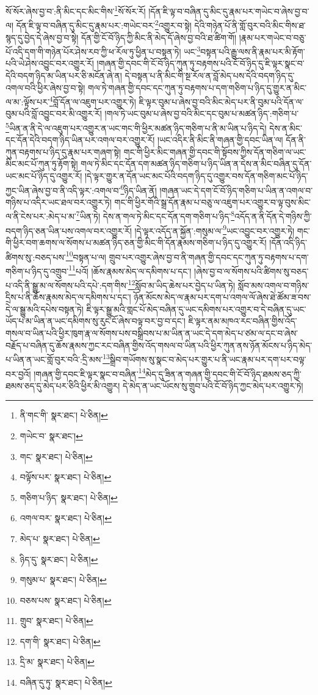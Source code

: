 སོ་སོར་ཞེས་བྱ་བ་:ནི་མིང་དང་མིང་གིས་\footnote{ནི་གང་གི་  སྣར་ཐང་།  པེ་ཅིན། }སོ་སོར་རོ། །དོན་ཇི་ལྟ་བ་བཞིན་དུ་མིང་དུ་རྣམ་པར་གཡེང་བ་ཞེས་བྱ་བ་ལ། དོན་ཇི་ལྟ་བ་བཞིན་དུ་མིང་དུ་རྣམ་པར་:གཡེང་བར་\footnote{གཡེང་བ་  སྣར་ཐང་། }འགྱུར་བ་སྟེ། དེའི་གཉེན་པོ་ནི་གློ་བུར་བའི་མིང་གིས་ཐ་སྙད་དུ་བྱེད་དེ་ཞེས་བྱ་བ་སྟེ། དོན་གྱི་ངོ་བོ་ཉིད་ཀྱི་མིང་ནི་མེད་དོ་ཞེས་བྱ་བའི་ཐ་ཚིག་གོ། །རྣམ་པར་གཡེང་བ་བཅུ་པོ་འདི་དག་གི་གཉེན་པོར་ཤེས་རབ་ཀྱི་ཕ་རོལ་ཏུ་ཕྱིན་པ་བསྟན་ཏེ། ཡང་\footnote{གང་  སྣར་ཐང་།  པེ་ཅིན། }བསྟན་པའི་རྒྱུ་ལས་ནི་རྣམ་པར་མི་རྟོག་པའི་ཡེ་ཤེས་འབྱུང་བར་འགྱུར་རོ། །གཞན་གྱི་དབང་གི་ངོ་བོ་ཉིད་ཀུན་ཏུ་བརྟགས་པའི་ངོ་བོ་ཉིད་དུ་ཇི་ལྟར་སྣང་བ་དེའི་བདག་ཉིད་མ་ཡིན་པར་ཅི་མངོན་ཞེ་ན། དེ་བསྟན་པ་ནི་མིང་གི་སྔ་རོལ་ན་བློ་མེད་པས་དེའི་བདག་ཉིད་དུ་འགལ་བའི་ཕྱིར་ཞེས་བྱ་བ་སྟེ། གལ་ཏེ་གཞན་གྱི་དབང་དང་ཀུན་ཏུ་བརྟགས་པ་དག་གཅིག་པ་ཉིད་དུ་གྱུར་ན་མིང་ལ་མ་:ལྟོས་པར་\footnote{བལྟོས་པར་  སྣར་ཐང་།  པེ་ཅིན། }བློ་དོན་ལ་འཇུག་པར་འགྱུར་ཏེ། ཇི་ལྟར་བུམ་པ་ཞེས་བྱ་བའི་མིང་མེད་པར་ནི་བུམ་པའི་དོན་ལ་བུམ་པའི་བློ་འབྱུང་བར་མི་འགྱུར་རོ། །གལ་ཏེ་ཡང་བུམ་པ་ཞེས་བྱ་བའི་མིང་དང་བུམ་པ་མཚན་ཉིད་:གཅིག་པ་\footnote{གཅིག་པ་ཉིད་  སྣར་ཐང་།  པེ་ཅིན། }ཡིན་ན་ནི་དེ་ལ་འཇུག་པར་འགྱུར་ན་ཡང་གང་གི་ཕྱིར་མཚན་ཉིད་གཅིག་པ་ནི་མ་ཡིན་པ་ཉིད་དེ། དེས་ན་མིང་དང་དོན་དེའི་བདག་ཉིད་ཡིན་པར་འགལ་བར་འགྱུར་རོ། །ཡང་འདིར་ནི་མིང་ནི་གཞན་གྱི་དབང་ཡིན་ལ། དོན་ནི་ཀུན་བརྟགས་པ་ཉིད་དུ་རྣམ་པར་གཞག་སྟེ། གང་གི་ཕྱིར་མིང་གཞན་གྱི་དབང་གི་སྟོབས་ཀྱིས་དོན་གཅིག་ལ་ཡང་མིང་མང་པོ་ཀུན་ཏུ་རྟོག་སྟེ། གལ་ཏེ་མིང་དང་དོན་དག་མཚན་ཉིད་གཅིག་པ་ཉིད་ཡིན་ན་དེས་ན་མིང་བཞིན་དུ་དོན་ཡང་མང་པོ་ཉིད་དུ་འགྱུར་རོ། །དེ་ལྟར་གྱུར་ན་དོན་ཡང་མང་པོའི་བདག་ཉིད་དུ་འགྱུར་བས་དོན་གཅིག་མང་པོ་ཉིད་ཀྱང་ཡིན་ཞེས་བྱ་བ་ནི་འདི་ལྟར་:འགལ་བ་\footnote{འགལ་བར་  སྣར་ཐང་།  པེ་ཅིན། }ཉིད་ཡིན་ནོ། །གཞན་ཡང་དེ་དག་ངོ་བོ་ཉིད་གཅིག་པ་ཡིན་ན་འགལ་བ་གཉིས་པ་འདིར་ཡང་ཐལ་བར་འགྱུར་ཏེ། གང་གི་ཕྱིར་གོའི་སྒྲ་དོན་རྣམ་པ་བཅུ་ལ་འཇུག་པར་འགྱུར་བ་ལྟ་བུས་མིང་ལ་ནི་ངེས་པར་:མེད་པ་མ་\footnote{མེད་པ་  སྣར་ཐང་།  པེ་ཅིན། }ཡིན་ཏེ། དེས་ན་གལ་ཏེ་མིང་དང་དོན་དག་གཅིག་པ་ཉིད་\footnote{ཉིད་དུ་  སྣར་ཐང་།  པེ་ཅིན། }འདོད་ན་ནི་དོན་དེ་གཉིས་ཀྱི་བདག་ཉིད་ཅན་ཡིན་པས་འགལ་བར་འགྱུར་རོ། །དེ་ལྟར་འདོད་ན་སྐྱོན་:གསུམ་ལ་\footnote{གསུམ་པ་  སྣར་ཐང་།  པེ་ཅིན། }ཡང་འབྱུང་བར་འགྱུར་ཏེ། གང་གི་ཕྱིར་བག་ཆགས་ལ་སོགས་པ་མཚན་ཉིད་ཅན་གྱི་མིང་གི་དོན་རྣམས་གཅིག་པ་ཉིད་དུ་འགྱུར་རོ། །དོན་འདི་ཉིད་ཚིགས་སུ་:བཅད་པས་\footnote{བཅས་པས་  སྣར་ཐང་།  པེ་ཅིན། }བསྟན་པ་ལ། གྲུབ་པར་འགྱུར་ཞེས་བྱ་བ་ནི་གཞན་གྱི་དབང་དང་ཀུན་ཏུ་བརྟགས་པ་དག་གཅིག་པ་ཉིད་དུ་འགྲུབ་\footnote{གྲུབ་  སྣར་ཐང་།  པེ་ཅིན། }པའོ། །ཆོས་རྣམས་མེད་ལ་དམིགས་པ་དང་། །ཞེས་བྱ་བ་ལ་སོགས་པའི་ཚིགས་སུ་བཅད་པ་འདི་ནི་སྒྱུ་མ་ལ་སོགས་པའི་དཔེ་:དག་གིས་\footnote{དག་གི་  སྣར་ཐང་།  པེ་ཅིན། }སློབ་མ་ཡིད་ཆེས་པར་བྱེད་པ་ཡིན་ཏེ། སློབ་མས་འགལ་བ་གཉིས་དྲིས་པ་ནི་ཆོས་རྣམས་མེད་ལ་དམིགས་པ་དང་། ཉོན་མོངས་མེད་ལ་རྣམ་པར་དག་པ་འགལ་ལོ་ཞེས་ཐེ་ཚོམ་ཟ་བས་དེ་ལ་སྒྱུ་མའི་དཔེས་བསྟན་ཏེ། ཇི་ལྟར་སྒྱུ་མའི་གླང་པོ་མེད་བཞིན་དུ་ཡང་དམིགས་པར་འགྱུར་བ་དེ་བཞིན་དུ་ཡང་ཡོད་པ་མ་ཡིན་ན་ཡང་དམིགས་སུ་རུང་ངོ་ཞེས་བལྟ་བར་བྱ་བ་དང་། ཇི་ལྟར་ནམ་མཁའ་རང་བཞིན་གྱིས་འོད་གསལ་བ་ཡིན་པའི་ཕྱིར་ཁུག་རྣ་ལ་སོགས་པས་བསྒྲིབས་པ་མ་ཡིན་ན་ཡང་དེ་དག་མེད་པ་ཙམ་ལ་དང་བ་ཞེས་བརྗོད་པ་བཞིན་དུ་ཆོས་རྣམས་ཀྱང་རང་བཞིན་གྱིས་འོད་གསལ་བ་ཡིན་པའི་ཕྱིར་ཀུན་ནས་ཉོན་མོངས་པ་ཉིད་མེད་པ་ཡིན་ན་ཡང་གློ་བུར་བའི་:དྲི་མས་\footnote{དྲི་མ་  སྣར་ཐང་།  པེ་ཅིན། }སྒྲིབ་གཡོགས་སུ་སྣང་བ་མེད་པར་གྱུར་པ་ནི་ཡང་རྣམ་པར་དག་པར་བལྟ་བར་བྱའོ། །གཞན་གྱི་དབང་ཇི་ལྟར་སྣང་བ་བཞིན་\footnote{བཞིན་དུ་ཏུ་  སྣར་ཐང་།  པེ་ཅིན། }མེད་དུ་ཟིན་ན་གཞན་གྱི་དབང་གི་ངོ་བོ་ཉིད་ཐམས་ཅད་ཀྱི་ཐམས་ཅད་དུ་མེད་པར་ཅིའི་ཕྱིར་མི་འགྱུར། དེ་མེད་ན་ཡང་ཡོངས་སུ་གྲུབ་པའི་ངོ་བོ་ཉིད་ཀྱང་མེད་པར་འགྱུར་ཏེ། 